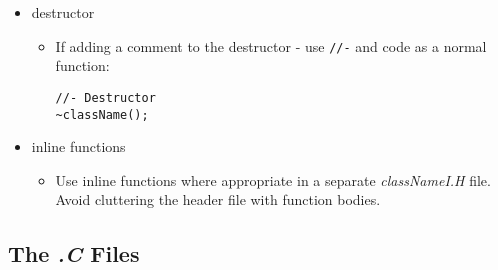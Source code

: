 \documentclass[11pt]{article}
\begin{document}
\begin{itemize}
\begin{itemize}
\begin{verbatim}
//- Search for \em name
//  in the following hierarchy:
//  -# personal settings:
//    - ~/.OpenFOAM/\<VERSION\>/
//      <em>for version-specific files</em>
//    - ~/.OpenFOAM/
//      <em>for version-independent files</em>
//  -# site-wide settings:
//    - $WM_PROJECT_INST_DIR/site/\<VERSION\>
//      <em>for version-specific files</em>
//    - $WM_PROJECT_INST_DIR/site/
//      <em>for version-independent files</em>
//  -# shipped settings:
//    - $WM_PROJECT_DIR/etc/
//
//  \return the full path name or fileName() if the name cannot be found
//  Optionally abort if the file cannot be found
fileName findEtcFile(const fileName&, bool mandatory=false);
\end{verbatim}
\item for more details see the Doxygen documentation.
\end{itemize}
\item destructor
\begin{itemize}
\item If adding a comment to the destructor -
        use \texttt{//-} and code as a normal function:

\begin{verbatim}
//- Destructor
~className();
\end{verbatim}
\end{itemize}
\item inline functions
\begin{itemize}
\item Use inline functions where appropriate in a separate \emph{classNameI.H}
        file.  Avoid cluttering the header file with function bodies.
\end{itemize}
\end{itemize}
\subsection{The \emph{.C} Files}
\label{sec-1-3}
\end{document}
